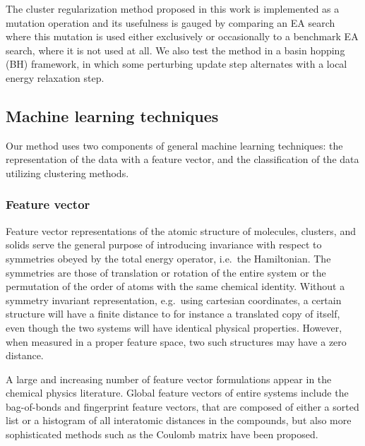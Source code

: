 \documentclass[aip,amsmath,amssymb,reprint]{revtex4-1}
\begin{document}
The cluster regularization method proposed in this work is implemented
as a mutation operation and its usefulness is gauged by comparing an
EA search where this mutation is used either exclusively or
occasionally to a benchmark EA search, where it is not used at all. We
also test the method in a basin hopping (BH) framework,\cite{wales1997} in which some
perturbing update step alternates with a local energy relaxation step.

\subsection{Machine learning techniques}
Our method uses two components of general machine learning techniques:
the representation of the data with a feature vector, and the
classification of the data utilizing clustering methods.

\subsubsection{Feature vector}
Feature vector representations of the atomic structure of molecules,
clusters, and solids serve the general purpose of introducing
invariance with respect to symmetries obeyed by the total energy
operator, i.e.\ the Hamiltonian.\cite{Bartok2013} The symmetries are those of translation
or rotation of the entire system or the permutation of the order of
atoms with the same chemical identity. Without a symmetry invariant
representation, e.g.\ using cartesian coordinates, a certain structure
will have a finite distance to for instance a translated copy of
itself, even though the two systems will have identical physical
properties. However, when measured in a proper feature space, two such
structures may have a zero distance.

A large and increasing number of feature vector formulations appear in
the chemical physics literature. Global feature vectors of entire
systems include the bag-of-bonds\cite{bag_of_bonds} and fingerprint\cite{finger_print,finger_print_application} feature
vectors, that are composed of either a sorted list or a histogram of
all interatomic distances in the compounds, but also more
sophisticated methods such as the Coulomb matrix\cite{coulomb_matrix1,coulomb_matrix2} have been
proposed.
\end{document}
